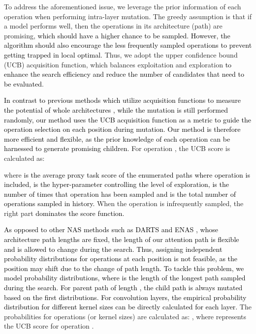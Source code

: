 \documentclass[letterpaper]{article} \usepackage{aaai22}  \usepackage{times}  \usepackage{helvet}  \usepackage{courier}  \usepackage[hyphens]{url}  \usepackage{graphicx} \urlstyle{rm} \def\UrlFont{\rm}  \usepackage{natbib}  \usepackage{caption} \DeclareCaptionStyle{ruled}{labelfont=normalfont,labelsep=colon,strut=off} \frenchspacing  \setlength{\pdfpagewidth}{8.5in}  \setlength{\pdfpageheight}{11in}  \usepackage{algorithm}
\newcommand{\prj}[1]{\textcolor{black}{#1}} \newcommand{\prjj}[1]{\textcolor{black}{#1}} \newcommand{\jhh}[1]{\textcolor{black}{#1}} \newcommand{\jh}[1]{\textcolor{black}{#1}} \newcommand{\sh}[1]{\textcolor{black}{#1}} \usepackage{multirow}
\begin{document}
To address the aforementioned issue, we leverage the prior information of each operation when performing intra-layer mutation.
The greedy assumption is that if a model performs well, then the operations
in its architecture (path) are promising, \prj{which should have a higher chance to be sampled. However, the algorithm should also encourage the less frequently sampled operations to prevent getting trapped in local optimal.}
Thus, we adopt the upper confidence bound (UCB) \citep{auer2002finite}
acquisition function, which balances exploitation and exploration \prj{to enhance the search efficiency and reduce the number of candidates that need to be evaluated}. 

\prjj{In contrast to previous methods which utilize acquisition functions to measure the potential of whole architectures \cite{li2017hyperband, shi2020bridging}, while the mutation is still performed randomly, our method uses the UCB acquisition function as a metric to guide the operation selection on each position during mutation. Our method is therefore more efficient and flexible, as the prior knowledge of each operation can be harnessed to generate promising children.} 
For operation , the UCB score  is calculated as: 
\vspace{-1mm}
\begin{small}

\end{small}
\hspace{-1.2mm}where \sh{ is the average \prj{proxy task score of the enumerated paths where operation  is included, }
 is the hyper-parameter controlling the level of exploration,  is the number of times that
operation  has been sampled and  is the total number of operations sampled in history.} When the operation is infrequently
sampled, the right part \prj{dominates the score function.}



\prj{As opposed to other NAS methods such as DARTS  \citep{liu2018darts} and ENAS  \citep{pham2018efficient}, whose architecture path lengths are fixed, the length of our attention path is flexible and is allowed to change during the search. Thus, assigning independent probability distributions
for operations at each position is not feasible, as the position may shift due to the change of path length. To tackle this problem, we model  probability distributions, where  is the length of the longest path sampled during the search. For \prj{parent} path of length , the \prj{child} path is always mutated based on the first  distributions.}
\prj{For convolution layers, the empirical probability distribution for different kernel sizes can be directly calculated for each layer.}
The probabilities for operations (or kernel sizes)
are calculated as: ,
where  represents the UCB score for operation .
\end{document}
